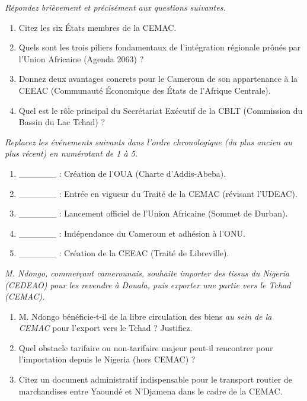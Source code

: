 \documentclass[11pt]{article}
\begin{document}
\begin{exercice}
\emph{Répondez brièvement et précisément aux questions suivantes.}
\begin{enumerate}
    \item Citez les six États membres de la CEMAC.
    \item Quels sont les trois piliers fondamentaux de l'intégration régionale prônés par l'Union Africaine (Agenda 2063) ?
    \item Donnez deux avantages concrets pour le Cameroun de son appartenance à la CEEAC (Communauté Économique des États de l'Afrique Centrale).
    \item Quel est le rôle principal du Secrétariat Exécutif de la CBLT (Commission du Bassin du Lac Tchad) ?
\end{enumerate}
\end{exercice}

\begin{exercice}
\emph{Replacez les événements suivants dans l'ordre chronologique (du plus ancien au plus récent) en numérotant de 1 à 5.}
\begin{enumerate}
    \item \_\_\_\_\_\_ : Création de l'OUA (Charte d'Addis-Abeba).
    \item \_\_\_\_\_\_ : Entrée en vigueur du Traité de la CEMAC (révisant l'UDEAC).
    \item \_\_\_\_\_\_ : Lancement officiel de l'Union Africaine (Sommet de Durban).
    \item \_\_\_\_\_\_ : Indépendance du Cameroun et adhésion à l'ONU.
    \item \_\_\_\_\_\_ : Création de la CEEAC (Traité de Libreville).
\end{enumerate}
\end{exercice}

\begin{exercice}
\emph{M. Ndongo, commerçant camerounais, souhaite importer des tissus du Nigeria (CEDEAO) pour les revendre à Douala, puis exporter une partie vers le Tchad (CEMAC).}
\begin{enumerate}
    \item M. Ndongo bénéficie-t-il de la libre circulation des biens \emph{au sein de la CEMAC} pour l'export vers le Tchad ? Justifiez.
    \item Quel obstacle tarifaire ou non-tarifaire majeur peut-il rencontrer pour l'importation depuis le Nigeria (hors CEMAC) ?
    \item Citez un document administratif indispensable pour le transport routier de marchandises entre Yaoundé et N'Djamena dans le cadre de la CEMAC.
\end{enumerate}
\end{exercice}
\end{document}
